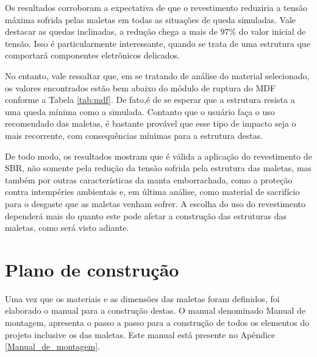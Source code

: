 Os resultados corroboram a expectativa de que o revestimento reduziria a tensão máxima sofrida pelas maletas em todas as situações de queda simuladas. Vale destacar as quedas inclinadas, a redução chega a mais de $97\%$ do valor inicial de tensão. Isso é particularmente interessante, quando se trata de uma estrutura que comportará componentes eletrônicos delicados.
\par No entanto, vale ressaltar que, em se tratando de análise do material selecionado, os valores encontrados estão bem abaixo do módulo de ruptura do MDF conforme a Tabela \ref{tab:mdf}. De fato,é de se esperar que a estrutura resista a uma queda mínima como a simulada. Contanto que o usuário faça o uso recomendado das maletas, é bastante provável que esse tipo de impacto seja o mais recorrente, com consequências mínimas para a estrutura destas.
\par De todo modo, os resultados mostram que é válida a aplicação do revestimento de SBR, não somente pela redução da tensão sofrida pela estrutura das maletas, mas também por outras características da manta emborrachada, como a proteção contra intempéries ambientais e, em última análise, como material de sacrifício para o desgaste que as maletas venham sofrer. A escolha do uso do revestimento dependerá mais do quanto este pode afetar a construção das estruturas das maletas, como será visto adiante.
	
	
\section{Plano de construção}

\par Uma vez que os materiais e as dimensões das maletas foram definidos, foi elaborado o manual para a construção destas. O manual denominado Manual de montagem, apresenta o passo a passo para a construção de todos os elementos do projeto inclusive os das maletas. Este manual está presente no Apêndice \ref{Manual_de_montagem}. 

